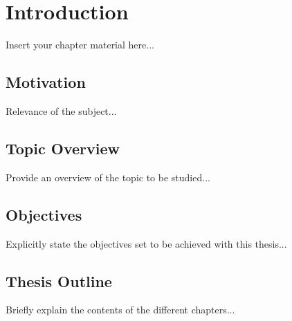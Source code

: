 
\chapter{Introduction}
\label{chapter:introduction}

Insert your chapter material here...

\section{Motivation}
\label{section:motivation}

Relevance of the subject...


\section{Topic Overview}
\label{section:overview}

Provide an overview of the topic to be studied...


\section{Objectives}
\label{section:objectives}

Explicitly state the objectives set to be achieved with this thesis...


\section{Thesis Outline}
\label{section:outline}

Briefly explain the contents of the different chapters...

